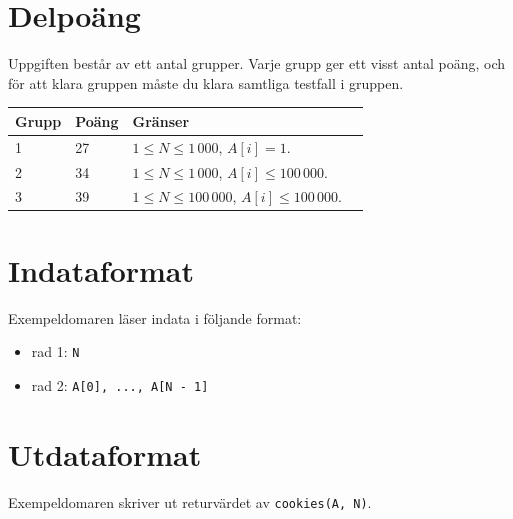 \section*{Delpoäng}
Uppgiften består av ett antal grupper. Varje grupp ger ett visst antal poäng, och för att klara
gruppen måste du klara samtliga testfall i gruppen.

\begin{tabular}{|l|l|l|p{5cm}|}
  \hline
  \textbf{Grupp} & \textbf{Poäng} & \textbf{Gränser} \\ \hline
  1 & 27 & $1 \le N \le 1\,000$, $A[i] = 1$. \\ \hline
  2 & 34 & $1 \le N \le 1\,000$, $A[i] \le 100\,000$. \\ \hline
  3 & 39 & $1 \le N \le 100\,000$, $A[i] \le 100\,000$. \\ \hline
\end{tabular}

\section*{Indataformat}
Exempeldomaren läser indata i följande format:

\begin{itemize}
  \item rad 1: \texttt{N}
  \item rad 2: \texttt{A[0], ..., A[N - 1]}
\end{itemize}

\section*{Utdataformat}
Exempeldomaren skriver ut returvärdet av \texttt{cookies(A, N)}.
